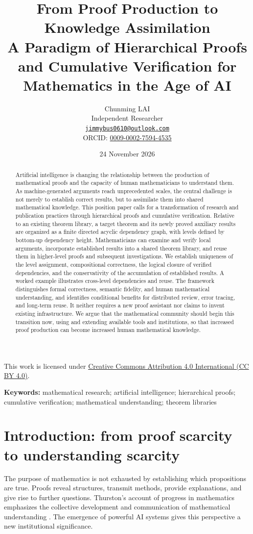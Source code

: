 \documentclass[11pt,a4paper]{article}
\title{\textbf{From Proof Production to Knowledge Assimilation}\\[5pt]\large A Paradigm of Hierarchical Proofs and Cumulative Verification for Mathematics in the Age of AI}
\author{Chunming LAI\\[2pt]\small Independent Researcher\\\small \href{mailto:jimmybus0610@outlook.com}{\texttt{jimmybus0610@outlook.com}}\\\small ORCID: \href{https://orcid.org/0009-0002-7594-4535}{0009-0002-7594-4535}}
\date{24 November 2026}
\theoremstyle{definition}\newtheorem{definition}{Definition}
\begin{document}
\maketitle
\begin{center}\small This work is licensed under \href{https://creativecommons.org/licenses/by/4.0/}{Creative Commons Attribution 4.0 International (CC BY 4.0)}.\end{center}
\begin{abstract}
Artificial intelligence is changing the relationship between the production of mathematical proofs and the capacity of human mathematicians to understand them. As machine-generated arguments reach unprecedented scales, the central challenge is not merely to establish correct results, but to assimilate them into shared mathematical knowledge. This position paper calls for a transformation of research and publication practices through hierarchical proofs and cumulative verification. Relative to an existing theorem library, a target theorem and its newly proved auxiliary results are organized as a finite directed acyclic dependency graph, with levels defined by bottom-up dependency height. Mathematicians can examine and verify local arguments, incorporate established results into a shared theorem library, and reuse them in higher-level proofs and subsequent investigations. We establish uniqueness of the level assignment, compositional correctness, the logical closure of verified dependencies, and the conservativity of the accumulation of established results. A worked example illustrates cross-level dependencies and reuse. The framework distinguishes formal correctness, semantic fidelity, and human mathematical understanding, and identifies conditional benefits for distributed review, error tracing, and long-term reuse. It neither requires a new proof assistant nor claims to invent existing infrastructure. We argue that the mathematical community should begin this transition now, using and extending available tools and institutions, so that increased proof production can become increased human mathematical knowledge.
\end{abstract}
\noindent\textbf{Keywords:} mathematical research; artificial intelligence; hierarchical proofs; cumulative verification; mathematical understanding; theorem libraries

\section{Introduction: from proof scarcity to understanding scarcity}
The purpose of mathematics is not exhausted by establishing which propositions are true. Proofs reveal structures, transmit methods, provide explanations, and give rise to further questions. Thurston's account of progress in mathematics emphasizes the collective development and communication of mathematical understanding \cite{thurston}. The emergence of powerful AI systems gives this perspective a new institutional significance.
\end{document}
